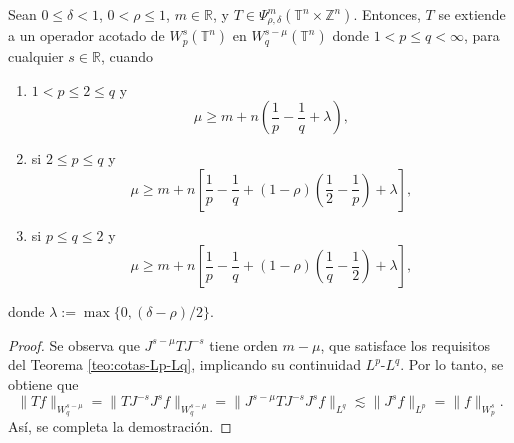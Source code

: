 \begin{theorem}
	Sean $0\leq\delta<1$, $0<\rho\leq 1$, $m\in\mathbb{R}$, y $T\in \Psi^m_{\rho,\delta}(\mathbb{T}^n\times\mathbb{Z}^n)$. Entonces, $T$ se extiende a un operador acotado de $W^{s}_p(\mathbb{T}^n)$ en $W^{s-\mu}_q (\mathbb{T}^n)$ donde $1<p\leq q<\infty$, para cualquier $s\in\mathbb{R}$, cuando 
	\begin{enumerate}
		\item $1<p\leq 2 \leq q$ y 
		\begin{equation*}
			\mu \geq m + n \left( \frac{1}{p} - \frac{1}{q} + \lambda
			\right),
		\end{equation*}
		\item si $2 \leq p \leq q$ y 
		\begin{equation*}
			\mu \geq m + n \left[ \frac{1}{p} - \frac{1}{q} + (1-\rho) \left( \frac{1}{2} - \frac{1}{p}
			\right)
			+ \lambda
			\right],
		\end{equation*}
		\item si $p\leq q \leq 2$ y 
		\begin{equation*}
			\mu \geq m + n \left[ \frac{1}{p} - \frac{1}{q} + (1-\rho) \left( \frac{1}{q} - \frac{1}{2}
			\right)
			+ \lambda
			\right],
		\end{equation*}
	\end{enumerate}
	donde $\lambda := \max\{ 0, (\delta-\rho)/2 \}$. 
\end{theorem}
\begin{proof}
	Se observa que $J^{s-\mu}T J^{-s}$ tiene orden $m-\mu$, que satisface los requisitos del Teorema \ref{teo:cotas-Lp-Lq}, implicando su continuidad $L^p$-$L^q$. Por lo tanto, se obtiene que
	\begin{equation*}
		\|T f\|_{W^{s-\mu}_q} = \|T J^{-s}J^sf\|_{W^{s-\mu}_q} 
		= \|J^{s-\mu}T J^{-s}J^sf\|_{L^q}
		\lesssim \|J^sf\|_{L^p} = \|f\|_{W^s_p}. 
	\end{equation*}
	Así, se completa la demostración.
\end{proof}

